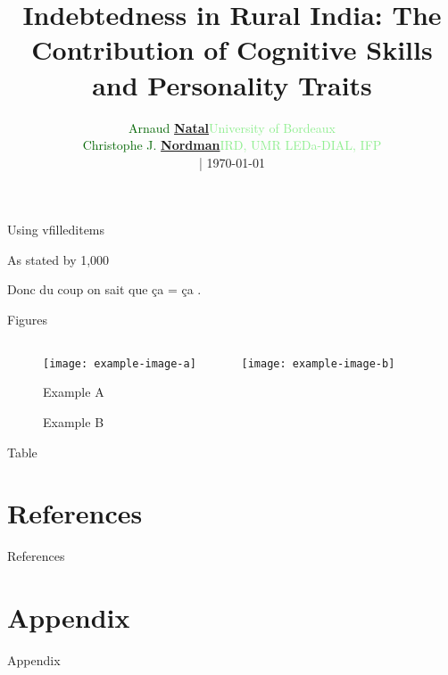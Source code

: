 \documentclass[aspectratio=169]{beamer}
\title[Skills \& Debt]{Indebtedness in Rural India: The Contribution of Cognitive Skills and Personality Traits}
\author[A. Natal and C.J. Nordman]{%
\begin{tabular}{ll}
\textcolor{darkgreen}{Arnaud \href{mailto:arnaud.natal@u-bordeaux.fr}{\textbf{Natal}}} & \textcolor{lightgreen}{University of Bordeaux}    \\
\textcolor{darkgreen}{Christophe J. \href{mailto:nordman@dial.prd}{\textbf{Nordman}}} & \textcolor{lightgreen}{IRD, UMR LEDa-DIAL, IFP}  \\
\end{tabular}
\begin{tabular}{r}
{\footnotesize  | \today}  \\
\end{tabular}
}%
\let\realcitep\citep
\renewcommand*{\citep}[1]{{\small\realcitep{#1}}}
\let\realcite\cite
\renewcommand*{\cite}[1]{{\small\realcite{#1}}}
\begin{document}
\maketitle




\begin{frame}{Using vfilleditems}
    \begin{vfilleditems}
        \item As stated by \cite{Laajaj2019} 1,000 \rupee
        \item Donc du coup on sait que ça = ça \citep{Brown2014}.
    \end{vfilleditems}
\end{frame}

\begin{frame}{Figures}
    \begin{figure}[H]
        \centering
        \begin{columns}[T]
            \begin{column}{.3\linewidth}
                \texttt{[image: example-image-a]}
                \caption{Example A}
            \end{column}
            \begin{column}{.3\linewidth}
                \texttt{[image: example-image-b]}
                \caption{Example B}
            \end{column}
        \end{columns}
    \end{figure}
\end{frame}


\begin{frame}[plain, shrink=2]{Table}



\end{frame}


\section{References}
\begin{frame}{References}


\end{frame}


\appendix %
\section*{Appendix}
\begin{frame}
    \centering
    \vfill
    {\fontsize{40}{50}\selectfont Appendix}
    \vfill
\end{frame}
\end{document}
